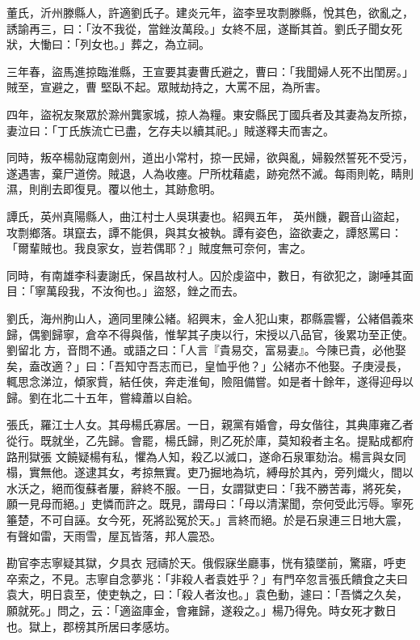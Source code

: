 \begin{pinyinscope}
 董氏，沂州滕縣人，許適劉氏子。建炎元年，盜李昱攻剽滕縣，悅其色，欲亂之，誘諭再三，曰：「汝不我從，當銼汝萬段。」女終不屈，遂斷其首。劉氏子聞女死狀，大慟曰：「列女也。」葬之，為立祠。



 三年春，盜馬進掠臨淮縣，王宣要其妻曹氏避之，曹曰：「我聞婦人死不出閨房。」賊至，宣避之，曹
 堅臥不起。眾賊劫持之，大罵不屈，為所害。



 四年，盜祝友聚眾於滁州龔家城，掠人為糧。東安縣民丁國兵者及其妻為友所掠，妻泣曰：「丁氏族流亡已盡，乞存夫以續其祀。」賊遂釋夫而害之。



 同時，叛卒楊勍寇南劍州，道出小常村，掠一民婦，欲與亂，婦毅然誓死不受污，遂遇害，棄尸道傍。賊退，人為收瘞。尸所枕藉處，跡宛然不滅。每雨則乾，睛則濕，則削去即復見。覆以他土，其跡愈明。



 譚氏，英州真陽縣人，曲江村士人吳琪妻也。紹興五年，
 英州饑，觀音山盜起，攻剽鄉落。琪竄去，譚不能俱，與其女被執。譚有姿色，盜欲妻之，譚怒罵曰：「爾輩賊也。我良家女，豈若偶耶？」賊度無可奈何，害之。



 同時，有南雄李科妻謝氏，保昌故村人。囚於虔盜中，數日，有欲犯之，謝唾其面目：「寧萬段我，不汝徇也。」盜怒，銼之而去。



 劉氏，海州朐山人，適同里陳公緒。紹興末，金人犯山東，郡縣震響，公緒倡義來歸，偶劉歸寧，倉卒不得與偕，惟挈其子庚以行，宋授以八品官，後累功至正使。劉留北
 方，音問不通。或語之曰：「人言『貴易交，富易妻』。今陳已貴，必他娶矣，盍改適？」曰：「吾知守吾志而已，皇恤乎他？」公緒亦不他娶。子庚浸長，輒思念涕泣，傾家貲，結任俠，奔走淮甸，險阻備嘗。如是者十餘年，遂得迎母以歸。劉在北二十五年，嘗緯蕭以自給。



 張氏，羅江士人女。其母楊氏寡居。一日，親黨有婚會，母女偕往，其典庫雍乙者從行。既就坐，乙先歸。會罷，楊氏歸，則乙死於庫，莫知殺者主名。提點成都府路刑獄張
 文饒疑楊有私，懼為人知，殺乙以滅口，遂命石泉軍劾治。楊言與女同榻，實無他。遂逮其女，考掠無實。吏乃掘地為坑，縛母於其內，旁列熾火，間以水沃之，絕而復蘇者屢，辭終不服。一日，女謂獄吏曰：「我不勝苦毒，將死矣，願一見母而絕。」吏憐而許之。既見，謂母曰：「母以清潔聞，奈何受此污辱。寧死箠楚，不可自誣。女今死，死將訟冤於天。」言終而絕。於是石泉連三日地大震，有聲如雷，天雨雪，屋瓦皆落，邦人震恐。



 勘官李志寧疑其獄，夕具衣
 冠禱於天。俄假寐坐廳事，恍有猿墜前，驚寤，呼吏卒索之，不見。志寧自念夢兆：「非殺人者袁姓乎？」有門卒忽言張氏饋食之夫曰袁大，明日袁至，使吏執之，曰：「殺人者汝也。」袁色動，遽曰：「吾憐之久矣，願就死。」問之，云：「適盜庫金，會雍歸，遂殺之。」楊乃得免。時女死才數日也。獄上，郡榜其所居曰孝感坊。




\end{pinyinscope}
